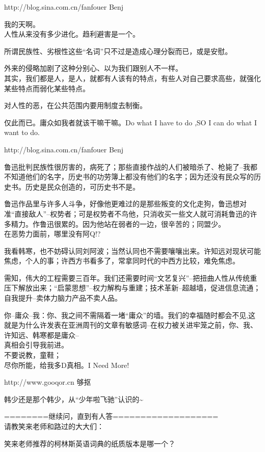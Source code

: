 http://blog.sina.com.cn/fanfouer Benj

我的天啊。\\ 人性从来没有多少进化。趋利避害是一个。

所谓民族性、劣根性这些``名词''只不过是造成心理分裂而已，或是安慰。

外来的侵略加剧了这种分别心、以为我们跟别人不一样。\\
其实，我们都是人，是人，就都有人该有的特点，有些人对自己要求高些，就强化某些特点而弱化某些特点。

对人性的恶，在公共范围内要用制度去制衡。

仅此而已。庸众如我者就该干嘛干嘛。Do what I have to do ,SO I can do what
I want to do.

http://blog.sina.com.cn/fanfouer Benj

鲁迅批判民族性很厉害的，病死了；那些直接作战的人们被暗杀了、枪毙了--我都不知道他们的名字，历史书的功劳簿上都没有他们的名字；因为还没有民众写的历史书。历史是民众创造的，可历史书不是。

鲁迅作品里与许多人斗争，好像他更难过的是那些叛变的文化走狗，鲁迅想对准``直接敌人''--权势者；可是权势者不鸟他，只消收买一些文人就可消耗鲁迅的许多精力。作鲁迅很累的。因为他站在弱者的一边，很辛苦的；同盟少。\\
在恶势力面前，哪里没有阿Q!?

我看韩寒，也不妨碍认同刘阿波；当然认同也不需要嚷嚷出来。许知远对现状可能焦虑，个人的事；许西方书看多了，常拿同时代的中西方比较，难免焦虑。

需知，伟大的工程需要三百年。我们还需要时间``文艺复兴''--把扭曲人性从传统重压下解放出来；``启蒙思想''--权力解构与重建；技术革新--超越墙，促进信息流通；自我提升--卖体力脑力产品不卖人品。

你--庸众--我：你、我之间不需隔着一堵``庸众''的墙。我们的幸福随时都会不见,这就是为什么许发表在亚洲周刊的文章有敏感词--在权力被关进牢笼之前，你、我、许知远、韩寒都是庸众--\\
真相会引导我前进。\\ 不要说教，童鞋；\\ 尽你所能，给我多D真相。I Need More!

http://www.gooqor.cn 够抠

韩少还是那个韩少，从``少年啦飞驰''认识的\textasciitilde{}

========继续问，直到有人答===================\\
请教笑来老师和路过的大大们：

笑来老师推荐的柯林斯英语词典的纸质版本是哪一个？

